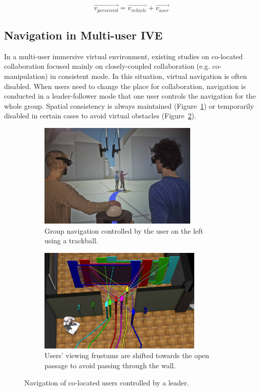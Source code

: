\begin{equation}
\overrightarrow{v_{perceived}} = \overrightarrow{v_{vehicle}} + \overrightarrow{v_{user}}
\end{equation}


\subsection{Navigation in Multi-user IVE}
In a multi-user immersive virtual environment, existing studies on co-located collaboration focused mainly on closely-coupled collaboration (e.g. co-manipulation) in consistent mode. In this situation, virtual navigation is often disabled. When users need to change the place for collaboration, navigation is conducted in a leader-follower mode that one user controls the navigation for the whole group. Spatial consistency is always maintained \citep{Beck2013IGG} (Figure~\ref{fig:2_group_navig:group_navig_1}) or temporarily disabled \citep{Kulik2011CSS} in certain cases to avoid virtual obstacles (Figure~\ref{fig:2_group_navig:group_navig_2}).

\begin{figure}[htb]
  \begin{subfigure}{.5\textwidth}
    \centering
    \includegraphics[height=5cm]{figures/ch2/group_navig_1}
    \caption{Group navigation controlled by the user on the left using a trackball.}
    \label{fig:2_group_navig:group_navig_1}
  \end{subfigure}
  \begin{subfigure}{.5\textwidth}
    \centering
    \includegraphics[height=5cm]{figures/ch2/group_navig_2}
    \caption{Users' viewing frustums are shifted towards the open passage to avoid passing through the wall.}
    \label{fig:2_group_navig:group_navig_2}
  \end{subfigure}
  \caption{\label{fig:2_group_navig}Navigation of co-located users controlled by a leader.}
\end{figure}

